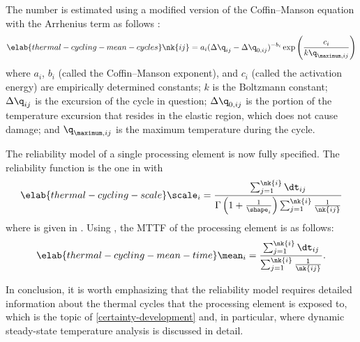 The number  is estimated using a modified version of the Coffin--Manson
equation with the Arrhenius term as follows \cite{xiang2010, jedec2016}:
\begin{equation} \elab{thermal-cycling-mean-cycles}
  \nk{ij} = a_i (\Delta \q_{ij} - \Delta \q_{0, ij})^{-b_i} \exp\left(\frac{c_i}{k \q_{\maximum, ij}}\right)
\end{equation}
where $a_i$, $b_i$ (called the Coffin--Manson exponent), and $c_i$ (called the
activation energy) are empirically determined constants; $k$ is the Boltzmann
constant; $\Delta \q_{ij}$ is the excursion of the cycle in question; $\Delta
\q_{0, ij}$ is the portion of the temperature excursion that resides in the
elastic region, which does not cause damage; and $\q_{\maximum, ij}$ is the
maximum temperature during the cycle.

The reliability model of a single processing element is now fully specified. The
reliability function is the one in  with
\begin{equation} \elab{thermal-cycling-scale}
  \scale_i = \frac{\sum_{j = 1}^{\nk{i}} \dt_{ij}}{\Gamma\left(1 + \frac{1}{\shape_i}\right) \sum_{j = 1}^{\nk{i}} \frac{1}{\nk{ij}}}
\end{equation}
where  is given in . Using
, the \ac{MTTF} of the processing element is as
follows:
\begin{equation} \elab{thermal-cycling-mean-time}
  \mean_i = \frac{\sum_{j = 1}^{\nk{i}} \dt_{ij}}{\sum_{j = 1}^{\nk{i}} \frac{1}{\nk{ij}}}.
\end{equation}

In conclusion, it is worth emphasizing that the reliability model requires
detailed information about the thermal cycles that the processing element is
exposed to, which is the topic of \cref{certainty-development} and, in
particular,  where dynamic steady-state
temperature analysis is discussed in detail.
